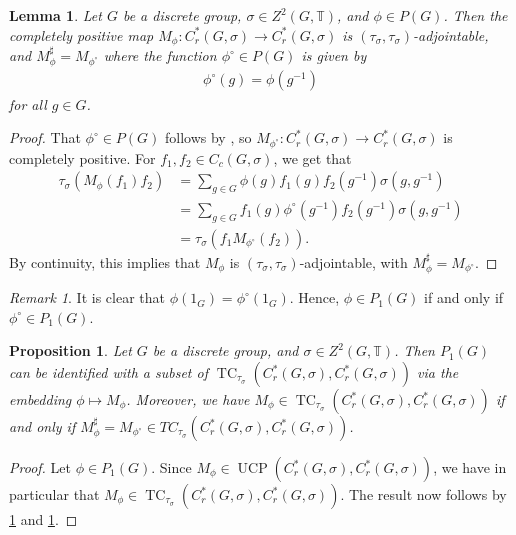 \documentclass[11pt, a4paper, oneside, final, reqno]{amsart}
\newcommand{\bbT}{\mathbb{T}}
\newcommand{\UCP}{\operatorname{UCP}}
\newcommand{\TC}{\operatorname{TC}}
\newcommand{\Cred}{C^*_r}
\theoremstyle{definition}
\theoremstyle{plain}
\newtheorem{proposition}[definition]{Proposition}
\newtheorem{lemma}[definition]{Lemma}
\theoremstyle{remark}
\newtheorem{remark}[definition]{Remark}
\numberwithin{equation}{section}
\begin{document}
\begin{lemma}\label{lemma:adjointability of multipliers}
    Let $G$ be a discrete group, $\sigma\in Z^2(G,\bbT)$, and $\phi \in P(G)$. Then the completely positive map $M_\phi \colon \Cred(G,\sigma) \to \Cred(G,\sigma)$ is $(\tau_{\sigma},\tau_{\sigma})$-adjointable, and $M_\phi^\sharp = M_{\phi^\circ}$ where the function $\phi^\circ \in P(G)$ is given by
    \begin{align*}
        \phi^\circ (g) = \phi(g^{-1})
    \end{align*}
    for all $g \in G$.
\end{lemma}
\begin{proof}
    That $\phi^\circ \in P(G)$ follows by \cite[p.~7]{BedosConti2016},  
    so 
    $M_{\phi^\circ} \colon \Cred(G,\sigma) \to \Cred(G, \sigma)$ is completely positive. 
    For $f_1 , f_2\in C_c(G,\sigma)$, we get that
    \begin{align*}
        \tau_{\sigma}(M_\phi(f_1) f_2) & = \sum_{g \in G} \phi(g) f_1(g) f_2(g^{-1}) \sigma(g,g^{-1}) \\
        & = \sum_{g \in G} f_1(g) \phi^\circ(g^{-1}) f_2(g^{-1}) \sigma(g,g^{-1}) \\
        & = \tau_{\sigma}(f_1 M_{\phi^\circ}(f_2)).
    \end{align*}
    By continuity, this implies that $M_\phi$ is $(\tau_{\sigma},\tau_{\sigma})$-adjointable, with $M_\phi^\sharp = M_{\phi^\circ}$.
\end{proof}

\begin{remark}\label{rem:unitality of multipliers}
    It is clear that $\phi(1_G) = \phi^\circ(1_G)$. Hence, $\phi \in P_1(G)$ if and only if $\phi^\circ \in P_1(G)$.
\end{remark}

\begin{proposition}\label{prop:multipliers as self-adjoint subset of ucp maps}
    Let $G$ be a discrete group, and $\sigma \in Z^2(G,\bbT)$.
    Then $P_{1}(G)$ can be identified with a  subset of $\TC_{\tau_\sigma}(\Cred(G,\sigma),\Cred(G,\sigma))$ via the embedding $\phi \mapsto M_\phi$. Moreover, we have $M_\phi \in \TC_{\tau_\sigma}(\Cred(G,\sigma),\Cred(G,\sigma))$ if and only if $M_\phi^\sharp = M_{\phi^\circ} \in TC_{\tau_\sigma}(\Cred(G,\sigma),\Cred(G,\sigma))$.
\end{proposition}
\begin{proof}
    Let $\phi \in P_{1}(G)$. Since $M_\phi \in \UCP(\Cred(G,\sigma),\Cred(G,\sigma))$, we have in particular that $M_\phi \in \TC_{\tau_\sigma}(\Cred(G,\sigma),\Cred(G,\sigma))$. The result now follows by \cref{lemma:adjointability of multipliers} and \cref{rem:unitality of multipliers}.
\end{proof}
\end{document}
